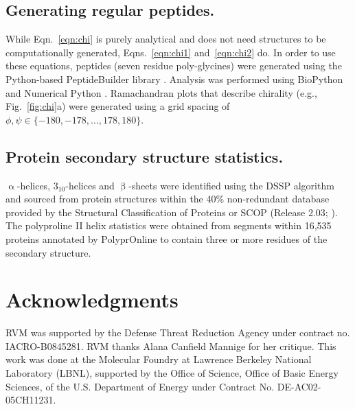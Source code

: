 \documentclass[fleqn,10pt]{wlpeerj} %
\newcommand{\Fig}[1]{Fig.~\ref{#1}}
\newcommand{\Eqn}[1]{Eqn.~\ref{#1}}
\newcommand{\Eqns}[1]{Eqns.~\ref{#1}}
\begin{document}
\subsection*{Generating regular peptides.}
While \Eqn{eqn:chi} is purely analytical and does not need structures to be computationally generated, \Eqns{eqn:chi1} and~\ref{eqn:chi2} do. In order to use these equations, peptides (seven residue poly-glycines) were generated using the Python-based PeptideBuilder library \citep{Matthew2013}. Analysis was performed using BioPython \citep{Cock2009} and Numerical Python \citep{VanDerWalt2011}. Ramachandran plots that describe chirality (e.g., \Fig{fig:chi}a) were generated using a grid spacing of $\phi,\psi \in \{-180,-178,\ldots,178,180\}$.

\subsection*{Protein secondary structure statistics.} 
$\upalpha$-helices, $3_{10}$-helices and $\upbeta$-sheets were identified using the DSSP algorithm \citep{Zhao2005,Kabsch1983,Joosten2011} and sourced from protein structures within the 40\% non-redundant database provided by the Structural Classification of Proteins or SCOP (Release 2.03; \cite{Fox2014}). The polyproline II helix statistics were obtained from segments within 16,535 proteins annotated by PolyprOnline \citep{Chebrek2014} to contain three or more residues of the secondary structure.

\section*{Acknowledgments}

RVM was supported by the Defense Threat Reduction Agency under contract no. IACRO-B0845281. RVM thanks Alana Canfield Mannige for her critique. This work was done at the Molecular Foundry at Lawrence Berkeley National Laboratory (LBNL), supported by the Office of Science, Office of Basic Energy Sciences, of the U.S. Department of Energy under Contract No. DE-AC02-05CH11231.


\end{document}
